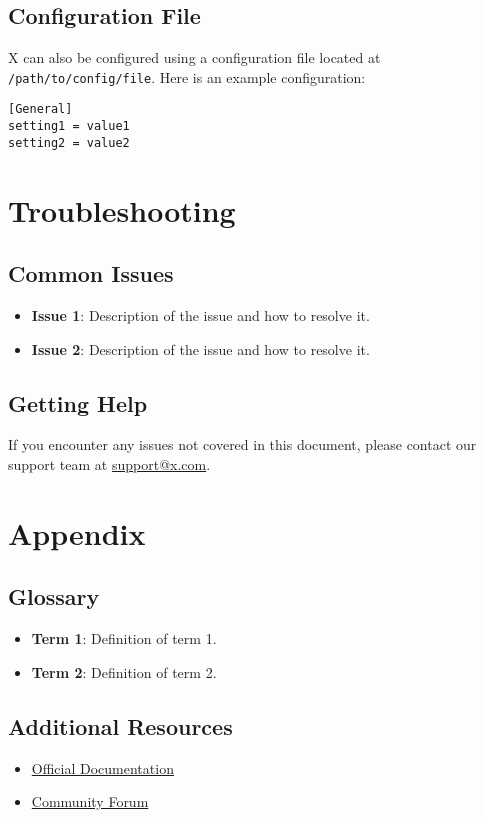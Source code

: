 \documentclass[a4paper,12pt]{article}
\begin{document}
\subsection{Configuration File}
X can also be configured using a configuration file located at \texttt{/path/to/config/file}. Here is an example configuration:
\begin{lstlisting}
[General]
setting1 = value1
setting2 = value2
\end{lstlisting}

\section{Troubleshooting}
\subsection{Common Issues}
\begin{itemize}
    \item \textbf{Issue 1}: Description of the issue and how to resolve it.
    \item \textbf{Issue 2}: Description of the issue and how to resolve it.
\end{itemize}

\subsection{Getting Help}
If you encounter any issues not covered in this document, please contact our support team at \href{mailto:support@x.com}{support@x.com}.

\section{Appendix}
\subsection{Glossary}
\begin{itemize}
    \item \textbf{Term 1}: Definition of term 1.
    \item \textbf{Term 2}: Definition of term 2.
\end{itemize}

\subsection{Additional Resources}
\begin{itemize}
    \item \href{https://www.x.com/documentation}{Official Documentation}
    \item \href{https://www.x.com/forum}{Community Forum}
\end{itemize}
\end{document}
